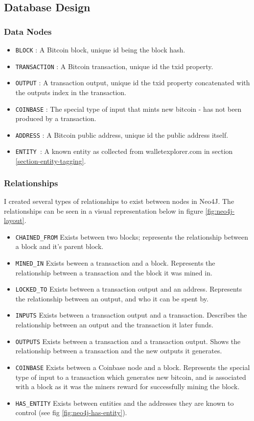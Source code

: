 \subsection{Database Design}

\subsubsection{Data Nodes}
\begin{itemize}
    \item \texttt{BLOCK} : A Bitcoin block, unique id being the block hash. 
    \item \texttt{TRANSACTION} : A Bitcoin transaction, unique id the txid property.
    \item \texttt{OUTPUT} : A transaction output, unique id the txid property concatenated with the outputs index in the transaction.
    \item \texttt{COINBASE} : The special type of input that mints new bitcoin - has not been produced by a transaction. 
    \item \texttt{ADDRESS} : A Bitcoin public address, unique id the public address itself.
    \item \texttt{ENTITY }: A known entity as collected from walletexplorer.com in section \ref{section-entity-tagging}. 
\end{itemize}

\subsubsection{Relationships}
I created several types of relationships to exist between nodes in Neo4J. The relationships can be seen in a visual representation below in figure \ref{fig:neo4j-layout}.
\begin{itemize}
    \item \texttt{CHAINED\_FROM} Exists between two blocks; represents the relationship between a block and it's parent block. 
    \item \texttt{MINED\_IN} Exists beween a transaction and a block. Represents the relationship between a transaction and the block it was mined in. 
    \item \texttt{LOCKED\_TO} Exists between a transaction output and an address. Represents the relationship between an output, and who it can be spent by. 
    \item \texttt{INPUTS} Exists between a transaction output and a transaction. Describes the relationship between an output and the transaction it later funds. 
    \item \texttt{OUTPUTS} Exists between a transaction and a transaction output. Shows the relationship between a transaction and the new outputs it generates. 
    \item \texttt{COINBASE} Exists between a Coinbase node and a block. Represents the special type of input to a transaction which generates new bitcoin, and is associated with a block as it was the miners reward for successfully mining the block. 
    \item \texttt{HAS\_ENTITY} Exists between entities and the addresses they are known to control (see fig \ref{fig:neo4j-has-entity}).
\end{itemize}


